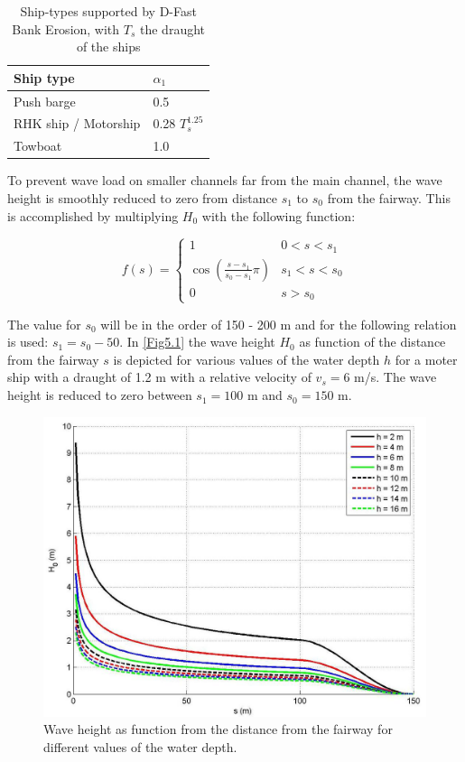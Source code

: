 \begin{table}[!h]
	\begin{tabular}{ll}
		Ship type & $\alpha_1$ \\ \hline
		Push barge & 0.5 \\
		RHK ship / Motorship & 0.28 $T_s^\text{1.25}$ \\
		Towboat & 1.0 \\ \hline
	\end{tabular}
	\caption{Ship-types supported by D-Fast Bank Erosion, with $T_s$  the draught of the ships}
	\label{Tabships}
\end{table}

\clearpage
To prevent wave load on smaller channels far from the main channel, the wave height is smoothly reduced to zero from distance $s_1$ to $s_0$ from the fairway.
This is accomplished by multiplying $H_0$ with the following function:

\begin{equation}
f(s) = \left \{ \begin{matrix}
1 & 0 < s < s_1 \\
\cos \left ( \frac{s - s_1}{s_0 - s_1} \pi \right ) & s_1 < s < s_0 \\
0 & s > s_0
\end{matrix} \right .
\end{equation}

The value for $s_0$ will be in the order of 150 - 200 m and for  the following relation is used: $s_1 = s_0 - 50$.
In \autoref{Fig5.1} the wave height $H_0$ as function of the distance from the fairway $s$ is depicted for various values of the water depth $h$ for a moter ship with a draught of 1.2 m with a relative velocity of $v_s = 6$ m/s.
The wave height is reduced to zero between $s_1 = 100$ m and $s_0 = 150$ m.

\begin{figure}[!hb]
\includegraphics[width=\textwidth]{figures/Fig5-1.png}
\caption{Wave height as function from the distance from the fairway for different values of the water depth.}
\label{Fig5.1}
\end{figure}
